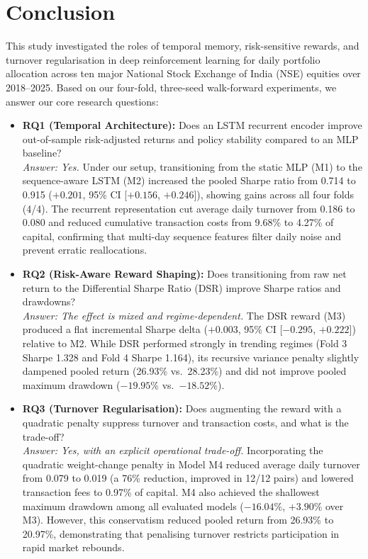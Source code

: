 \documentclass[11pt,a4paper]{article}
\numberwithin{equation}{section}
\numberwithin{table}{section}
\numberwithin{figure}{section}
\numberwithin{algorithm}{section}
\begin{document}
\section{Conclusion}\label{ch:concl}
This study investigated the roles of temporal memory, risk-sensitive rewards, and turnover regularisation in deep reinforcement learning for daily portfolio allocation across ten major National Stock Exchange of India (NSE) equities over 2018--2025. Based on our four-fold, three-seed walk-forward experiments, we answer our core research questions:
\begin{itemize}
\item \textbf{RQ1 (Temporal Architecture):} Does an LSTM recurrent encoder improve out-of-sample risk-adjusted returns and policy stability compared to an MLP baseline?\\
\textit{Answer: Yes.} Under our setup, transitioning from the static MLP (M1) to the sequence-aware LSTM (M2) increased the pooled Sharpe ratio from 0.714 to 0.915 ($+0.201$, 95\% CI [$+0.156$, $+0.246$]), showing gains across all four folds (4/4). The recurrent representation cut average daily turnover from 0.186 to 0.080 and reduced cumulative transaction costs from 9.68\% to 4.27\% of capital, confirming that multi-day sequence features filter daily noise and prevent erratic reallocations.
\item \textbf{RQ2 (Risk-Aware Reward Shaping):} Does transitioning from raw net return to the Differential Sharpe Ratio (DSR) improve Sharpe ratios and drawdowns?\\
\textit{Answer: The effect is mixed and regime-dependent.} The DSR reward (M3) produced a flat incremental Sharpe delta ($+0.003$, 95\% CI [$-0.295$, $+0.222$]) relative to M2. While DSR performed strongly in trending regimes (Fold 3 Sharpe 1.328 and Fold 4 Sharpe 1.164), its recursive variance penalty slightly dampened pooled return (26.93\% vs.\ 28.23\%) and did not improve pooled maximum drawdown ($-19.95\%$ vs.\ $-18.52\%$).
\item \textbf{RQ3 (Turnover Regularisation):} Does augmenting the reward with a quadratic penalty suppress turnover and transaction costs, and what is the trade-off?\\
\textit{Answer: Yes, with an explicit operational trade-off.} Incorporating the quadratic weight-change penalty in Model M4 reduced average daily turnover from 0.079 to 0.019 (a 76\% reduction, improved in 12/12 pairs) and lowered transaction fees to 0.97\% of capital. M4 also achieved the shallowest maximum drawdown among all evaluated models ($-16.04\%$, $+3.90\%$ over M3). However, this conservatism reduced pooled return from 26.93\% to 20.97\%, demonstrating that penalising turnover restricts participation in rapid market rebounds.

\end{itemize}
\end{document}

